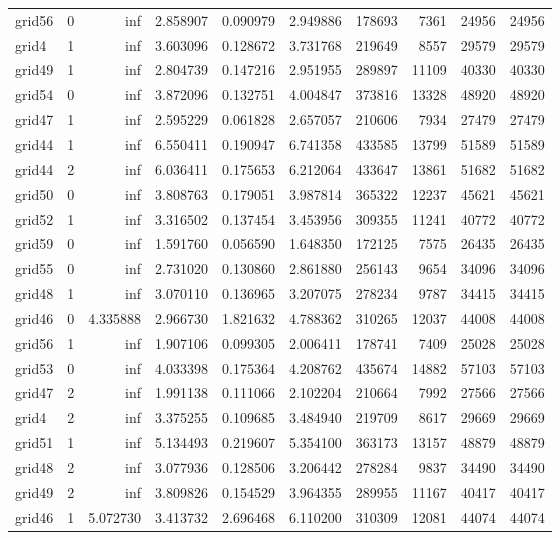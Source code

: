 \begin{longtable}{|l|r|r|r|r|r|r|r|r|r|}
grid56 & 0 & inf & 2.858907 & 0.090979 & 2.949886 & 178693 & 7361 & 24956 & 24956 \\
grid4 & 1 & inf & 3.603096 & 0.128672 & 3.731768 & 219649 & 8557 & 29579 & 29579 \\
grid49 & 1 & inf & 2.804739 & 0.147216 & 2.951955 & 289897 & 11109 & 40330 & 40330 \\
grid54 & 0 & inf & 3.872096 & 0.132751 & 4.004847 & 373816 & 13328 & 48920 & 48920 \\
grid47 & 1 & inf & 2.595229 & 0.061828 & 2.657057 & 210606 & 7934 & 27479 & 27479 \\
grid44 & 1 & inf & 6.550411 & 0.190947 & 6.741358 & 433585 & 13799 & 51589 & 51589 \\
grid44 & 2 & inf & 6.036411 & 0.175653 & 6.212064 & 433647 & 13861 & 51682 & 51682 \\
grid50 & 0 & inf & 3.808763 & 0.179051 & 3.987814 & 365322 & 12237 & 45621 & 45621 \\
grid52 & 1 & inf & 3.316502 & 0.137454 & 3.453956 & 309355 & 11241 & 40772 & 40772 \\
grid59 & 0 & inf & 1.591760 & 0.056590 & 1.648350 & 172125 & 7575 & 26435 & 26435 \\
grid55 & 0 & inf & 2.731020 & 0.130860 & 2.861880 & 256143 & 9654 & 34096 & 34096 \\
grid48 & 1 & inf & 3.070110 & 0.136965 & 3.207075 & 278234 & 9787 & 34415 & 34415 \\
grid46 & 0 & 4.335888 & 2.966730 & 1.821632 & 4.788362 & 310265 & 12037 & 44008 & 44008 \\
grid56 & 1 & inf & 1.907106 & 0.099305 & 2.006411 & 178741 & 7409 & 25028 & 25028 \\
grid53 & 0 & inf & 4.033398 & 0.175364 & 4.208762 & 435674 & 14882 & 57103 & 57103 \\
grid47 & 2 & inf & 1.991138 & 0.111066 & 2.102204 & 210664 & 7992 & 27566 & 27566 \\
grid4 & 2 & inf & 3.375255 & 0.109685 & 3.484940 & 219709 & 8617 & 29669 & 29669 \\
grid51 & 1 & inf & 5.134493 & 0.219607 & 5.354100 & 363173 & 13157 & 48879 & 48879 \\
grid48 & 2 & inf & 3.077936 & 0.128506 & 3.206442 & 278284 & 9837 & 34490 & 34490 \\
grid49 & 2 & inf & 3.809826 & 0.154529 & 3.964355 & 289955 & 11167 & 40417 & 40417 \\
grid46 & 1 & 5.072730 & 3.413732 & 2.696468 & 6.110200 & 310309 & 12081 & 44074 & 44074 \\

\end{longtable}
